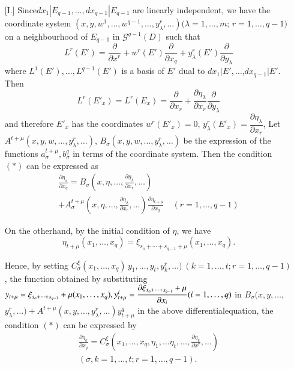 \begin{enumerate} [I.]
  Since\pageoriginale $dx_1| E_{q-1}, \ldots, dx_{q-1} |  E_{q-1}$ are linearly
  independent, we have the coordinate system $(x, y, w^1, \ldots ,
  w^{q-1}, \ldots , y^r_\lambda , \ldots) ( \lambda =1, \ldots , m$;
  $r=1, \ldots , q-1)$ on a neighbourhood of $E_{q-1}$ in
  $\mathscr{G}^{q-1}(D)$ such that  
  $$
  L^r (E') = \frac{\partial}{\partial x^r} + w^r(E')
  \frac{\partial}{\partial x_q} +  y^r_ \lambda (E')
  \frac{\partial}{\partial y_\lambda} 
  $$
  where $L^1 (E'), \ldots, L^{q-1}(E')$ is a basis of $E'$ dual to
  $dx_1| E' , \ldots$,\break  $dx_{q-1}| E'$. Then  
  $$
  L^r(E'_x) = L^r(E_x) = \frac{\partial}{\partial x_r} +
  \frac{\partial \eta_\lambda}{\partial x_r} \frac{\partial}{\partial
    y_\lambda} 
  $$
  and therefore $E'_x$ has the coordinates $w^r(E'_x) = 0$,
  $y^r_\lambda(E'_x) = \dfrac{\partial \eta_\lambda}{\partial x_r}$,
  Let $A^{t  +  \mu}(x, y, w, \ldots , y^r_\lambda , \ldots)$,
  $B_\sigma (x,y,w, \ldots , y^r_\lambda , \ldots )$ be the expression
  of the functions $a^{t+\mu}_\sigma, b^q_\sigma$ in terms of the
  coordinate system. Then the condition $(*)$ can be expressed as  
  \begin{multline*}
  \frac{\partial \eta_\sigma}{\partial x_q}= B_\sigma \left(x, \eta,\ldots
  ,\frac{\partial \eta_\lambda}{\partial x_r},  \ldots \right)\\  
  +  A^{t + \mu}_\sigma \left(x, \eta, \ldots , \frac{\partial
    \eta_\lambda}{\partial x_r}, \ldots \right) \frac{\partial \eta_{t+
      \mu}}{\partial x_q} \quad ( r=1, \ldots , q-1) 
  \end{multline*}
  
  On the otherhand, by the initial condition of $\eta$, we have 
  $$
  \eta_{t + \mu}(x_1,  \ldots , x_q) = \xi_{s_o +  \cdots + s_{q-1}+
    \mu} (x_1, \ldots , x_q). 
  $$

  Hence, by  setting $C^{\xi}_\sigma (x_1, \ldots , x_q)\, y_1 ,
  \ldots , y_t , y^r_k , \ldots)~ (k=1, \ldots
  , t ; r =1, \ldots , q-1)$, the function obtained by substituting
  $y_{t + \mu}= \xi_{s_o +\cdots + s_{q-1}}\break + \mu (x_1, \ldots , x_q),
  y^i_{t + \mu}= \dfrac{\partial \xi_{s_o+ \cdots + s_{q-1}}+ \mu}{
    \partial x_i} (i=1, \ldots , q)$  in $B_\sigma (x, y, \ldots$,
  $y^r_\lambda , \ldots) + A^{t+ \mu} (x,y, \ldots , y^r_\lambda,
  \ldots ) y^q_{t +  \mu} $ in the above differential\pageoriginale equation, the
  condition $(*)$ can be expressed by  
  \begin{multline*}
    \frac{\partial \eta_\sigma}{\partial x_q}= C^\xi_\sigma \left(x_1,
    \ldots , x_q, \eta_1 , \ldots \eta_t , \ldots, \frac{\partial
      \eta_k}{\partial x^r}, \ldots \right) \\
    ( \sigma, k=1 , \ldots , t ;  r=1, \ldots , q-1).
  \end{multline*}
\end{enumerate}
